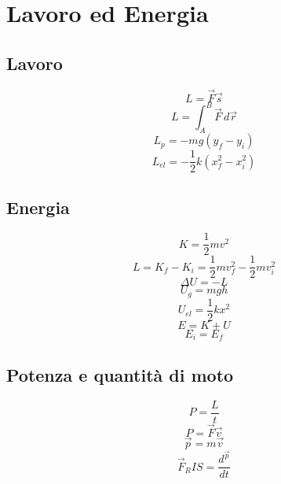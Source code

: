 \documentclass[../../dimostrazioni]{subfiles}
\begin{document}
    \chapter{Lavoro ed Energia}

        \section*{Lavoro}
        
            \[ L = \vec{F} \vec{s}  \] %
            \[ L = \int_{A}^{B}\vec{F} \, d\vec{r}  \] %
            \[ L_{p} = -mg(y_f - y_i)  \] %
            \[ L_{el} = - \frac{1}{2} k (x_f^2 - x_i^2)  \] %
           
        \section*{Energia}

            \[ K = \frac{1}{2} m v^2  \] %
            \[ L = K_f - K_i  = \frac{1}{2} m v_f^2 - \frac{1}{2} m v_i^2 \] %
            \[ \Delta U = - L \] %
            \[ U_g = m g h \] %
            \[ U_{el} = \frac{1}{2} k x^2 \] %
            \[ E = K + U \] %
            \[ E_i = E_f \] %

        \section*{Potenza e quantità di moto}

            \[ P = \frac{L}{t} \] %
            \[ P = \vec{F} \vec{v} \] %
            \[ \vec{p} = m\vec{v} \] %
            \[ \vec{F}_RIS = \frac{d^\vec{p}}{dt}\] %
\end{document}
